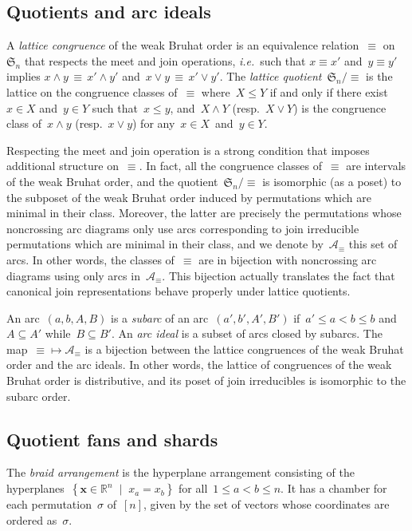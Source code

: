 \documentclass{amsart}
\theoremstyle{definition}
\newcommand{\R}{\mathbb{R}} %
\renewcommand{\c}[1]{\mathcal{#1}} %
\renewcommand{\b}[1]{{\boldsymbol{#1}}} %
\newcommand{\f}[1]{\mathfrak{#1}} %
\newcommand{\set}[2]{\left\{ #1 \;\middle|\; #2 \right\}} %
\newcommand{\ie}{\textit{i.e.}~} %
\newcommand{\darkblue}{\color{darkblue}} %
\newcommand{\defn}[1]{\textsl{\darkblue #1}} %
\newcommand{\meet}{\wedge} %
\newcommand{\join}{\vee} %
\begin{document}
\subsection{Quotients and arc ideals}

A \defn{lattice congruence} of the weak Bruhat order is an equivalence relation~$\equiv$ on~$\f{S}_n$ that respects the meet and join operations, \ie such that $x \equiv x'$ and~$y \equiv y'$ implies $x \meet y \, \equiv \, x' \meet y'$ and~$x \join y \, \equiv \, x' \join y'$.
The \defn{lattice quotient}~$\f{S}_n/{\equiv}$ is the lattice on the congruence classes of~$\equiv$ where~$X \le Y$ if and only if there exist~$x \in X$ and~$y \in Y$ such that~$x \le y$, and~$X \meet Y$ (resp.~$X \join Y$) is the congruence class of~$x \meet y$ (resp.~$x \join y$) for any~$x \in X$~and~$y \in Y$.

Respecting the meet and join operation is a strong condition that imposes additional structure on~$\equiv$.
In fact, all the congruence classes of~$\equiv$ are intervals of the weak Bruhat order, and the quotient~$\f{S}_n/{\equiv}$ is isomorphic (as a poset) to the subposet of the weak Bruhat order induced by permutations which are minimal in their class.
Moreover, the latter are precisely the permutations whose noncrossing arc diagrams only use arcs corresponding to join irreducible permutations which are minimal in their class, and we denote by~$\c{A}_\equiv$ this set of arcs.
In other words, the classes of~$\equiv$ are in bijection with noncrossing arc diagrams using only arcs in~$\c{A}_\equiv$.
This bijection actually translates the fact that canonical join representations behave properly under lattice quotients.

An arc~$(a, b, A, B)$ is a \defn{subarc} of an arc~$(a', b', A', B')$ if~$a' \le a < b \le b$ and~$A \subseteq A'$ while~$B \subseteq B'$.
An \defn{arc ideal} is a subset of arcs closed by subarcs.
The map~${\equiv} \mapsto \c{A}_\equiv$ is a bijection between the lattice congruences of the weak Bruhat order and the arc ideals.
In other words, the lattice of congruences of the weak Bruhat order is distributive, and its poset of join irreducibles is isomorphic to the subarc order.

\subsection{Quotient fans and shards}

The \defn{braid arrangement} is the hyperplane arrangement consisting of the hyperplanes~$\set{\b{x} \in \R^n}{x_a = x_b}$ for all~$1 \le a < b \le n$.
It has a chamber for each permutation~$\sigma$ of~$[n]$, given by the set of vectors whose coordinates are ordered as~$\sigma$.
\end{document}
